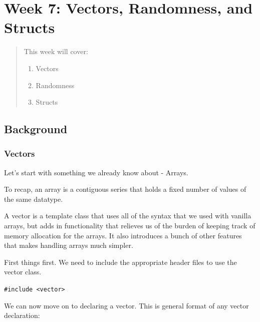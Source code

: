 \chapter*{Week 7: Vectors, Randomness, and Structs}
\setcounter{chapter}{8}
\setcounter{section}{0}






\begin{abstract}
This week will cover:
\begin{enumerate}
    \item Vectors
    \item Randomness
    \item Structs
\end{enumerate}
    
\end{abstract}

\section{Background}

\subsection{Vectors}

Let's start with something we already know about - Arrays.

To recap, an array is a contiguous series that holds a fixed number of values of the same datatype.

A vector is a template class that uses all of the syntax that we used with vanilla arrays, but adds in functionality that relieves us of the burden of keeping track of memory allocation for the arrays. It also introduces a bunch of other features that makes handling arrays much simpler.

First things first. We need to include the appropriate header files to use the vector class.

\texttt{#include <vector>}

We can now move on to declaring a vector. This is general format of any vector declaration:

